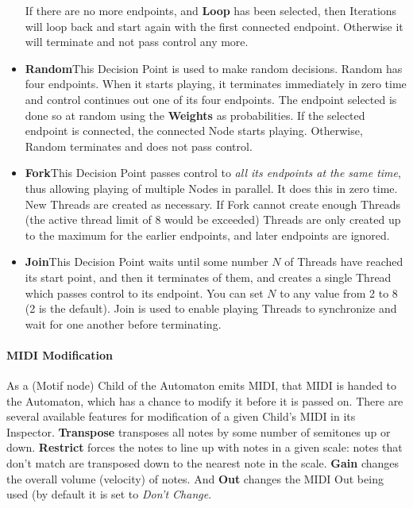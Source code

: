 \documentclass[twoside,10pt]{article}
\begin{document}
\begin{itemize}
If there are no more endpoints, and {\bf Loop} has been selected, then Iterations will loop back and start again with the first connected endpoint.  Otherwise it will terminate and not pass control any more.

\item{\bf Random}\quad This Decision Point is used to make random decisions.  Random has four endpoints.  When it starts playing, it terminates immediately in zero time and control continues out one of its four endpoints. The endpoint selected is done so at random using the {\bf Weights} as probabilities.  If the selected endpoint is connected, the connected Node starts playing.  Otherwise, Random terminates and does not pass control. 

\item{\bf Fork}\quad This Decision Point passes control to {\it all its endpoints at the same time}, thus allowing playing of multiple Nodes in parallel.  It does this in zero time.  New Threads are created as necessary.  If Fork cannot create enough Threads (the active thread limit of 8 would be exceeded) Threads are only created up to the maximum for the earlier endpoints, and later endpoints are ignored.

\item{\bf Join}\quad This Decision Point waits until some number \(N\) of Threads have reached its start point, and then it terminates of them, and creates a single Thread which passes control to its endpoint.  You can set \(N\) to any value from 2 to 8 (2 is the default).  Join is used to enable playing Threads to synchronize and wait for one another before terminating.  

\end{itemize}

\paragraph{MIDI Modification}

As a (Motif node) Child of the Automaton emits MIDI, that MIDI is handed to the Automaton, which has a chance to modify it before it is passed on.  There are several available features for modification of a given Child's MIDI in its Inspector.  {\bf Transpose} transposes all notes by some number of semitones up or down.  {\bf Restrict} forces the notes to line up with notes in a given scale: notes that don't match are transposed down to the nearest note in the scale.  {\bf Gain} changes the overall volume (velocity) of notes.  And {\bf Out} changes the MIDI Out being used (by default it is set to {\it Don't Change}.
\end{document}
